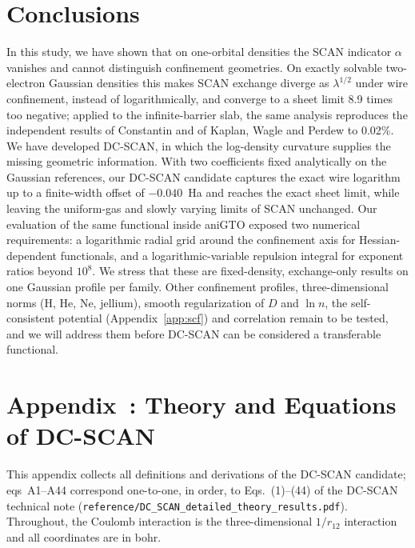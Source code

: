 \documentclass[journal=jctcce,manuscript=article]{achemso}
\newcommand{\novelty}[1]{{\color{red}#1}}
\begin{document}
\section{Conclusions}
\label{sec:conclusions}
In this study, we have shown that on one-orbital densities the SCAN indicator
$\alpha$ vanishes and cannot distinguish confinement geometries.  On exactly
solvable two-electron Gaussian densities this makes SCAN exchange diverge as
$\lambda^{1/2}$ under
wire confinement, instead of logarithmically, and converge to a sheet limit
8.9 times too negative; \novelty{applied to the infinite-barrier slab, the same analysis
reproduces the independent results of Constantin and of Kaplan, Wagle and Perdew
to 0.02\%.}  We have developed DC-SCAN, in which the log-density
curvature supplies the missing geometric information.  With two coefficients
fixed analytically on the Gaussian references, our DC-SCAN candidate captures
the exact wire logarithm
up to a finite-width offset of $-0.040$~Ha and reaches the exact sheet limit,
while leaving the uniform-gas and slowly varying limits of SCAN unchanged.
Our evaluation of the same functional inside aniGTO exposed two numerical
requirements: a logarithmic radial grid around the confinement axis for
Hessian-dependent functionals, and a logarithmic-variable repulsion integral
for exponent ratios beyond $10^8$.  We stress that these are fixed-density,
exchange-only results on one Gaussian profile per family.  Other confinement profiles,
three-dimensional norms (H, He, Ne, jellium), smooth regularization of $D$
and $\ln n$, the self-consistent potential (Appendix~\ref{app:scf}) and
correlation remain to be tested, and we will address them before DC-SCAN can be
considered a transferable functional.

\appendix

\section*{Appendix~\thesection: Theory and Equations of DC-SCAN}
\label{app:theory}
\setcounter{equation}{0}
\renewcommand{\theequation}{A\arabic{equation}}
This appendix collects all definitions and derivations of the DC-SCAN
candidate; eqs~A1--A44 correspond one-to-one, in order, to Eqs.~(1)--(44) of
the DC-SCAN technical note (\texttt{reference/DC\_SCAN\_detailed\_theory\_results.pdf}).  Throughout, the Coulomb interaction is the three-dimensional
$1/r_{12}$ interaction and all coordinates are in bohr.
\end{document}
